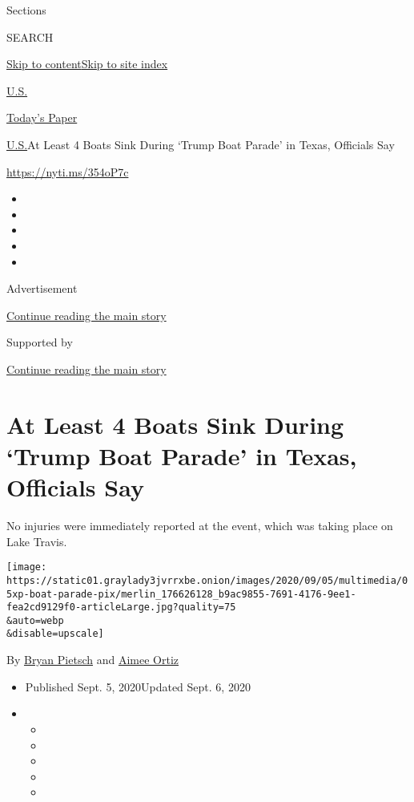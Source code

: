 Sections

SEARCH

\protect\hyperlink{site-content}{Skip to
content}\protect\hyperlink{site-index}{Skip to site index}

\href{https://www.nytimes3xbfgragh.onion/section/us}{U.S.}

\href{https://myaccount.nytimes3xbfgragh.onion/auth/login?response_type=cookie\&client_id=vi}{}

\href{https://www.nytimes3xbfgragh.onion/section/todayspaper}{Today's
Paper}

\href{/section/us}{U.S.}\textbar{}At Least 4 Boats Sink During `Trump
Boat Parade' in Texas, Officials Say

\url{https://nyti.ms/354oP7c}

\begin{itemize}
\item
\item
\item
\item
\item
\end{itemize}

Advertisement

\protect\hyperlink{after-top}{Continue reading the main story}

Supported by

\protect\hyperlink{after-sponsor}{Continue reading the main story}

\hypertarget{at-least-4-boats-sink-during-trump-boat-parade-in-texas-officials-say}{%
\section{At Least 4 Boats Sink During `Trump Boat Parade' in Texas,
Officials
Say}\label{at-least-4-boats-sink-during-trump-boat-parade-in-texas-officials-say}}

No injuries were immediately reported at the event, which was taking
place on Lake Travis.

\texttt{[image: https://static01.graylady3jvrrxbe.onion/images/2020/09/05/multimedia/05xp-boat-parade-pix/merlin\_176626128\_b9ac9855-7691-4176-9ee1-fea2cd9129f0-articleLarge.jpg?quality=75\\\&auto=webp\\\&disable=upscale]}

By \href{https://www.nytimes3xbfgragh.onion/by/bryan-pietsch}{Bryan
Pietsch} and
\href{https://www.nytimes3xbfgragh.onion/by/aimee-ortiz}{Aimee Ortiz}

\begin{itemize}
\item
  Published Sept. 5, 2020Updated Sept. 6, 2020
\item
  \begin{itemize}
  \item
  \item
  \item
  \item
  \item
  \end{itemize}
\end{itemize}

